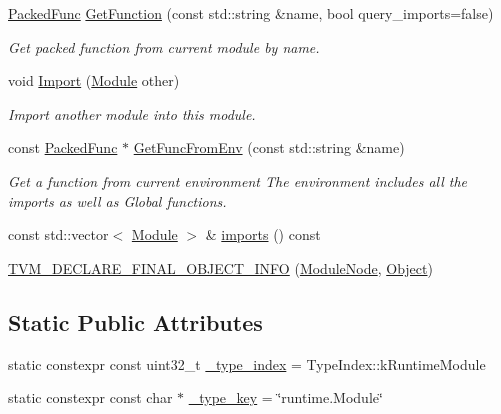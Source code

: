 \begin{DoxyCompactItemize}
\hyperlink{classtvm_1_1runtime_1_1PackedFunc}{Packed\+Func} \hyperlink{classtvm_1_1runtime_1_1ModuleNode_abd6d000714e0ed2b3b2f435ea5bd9a43}{Get\+Function} (const std\+::string \&name, bool query\+\_\+imports=false)
\begin{DoxyCompactList}\small\item\em Get packed function from current module by name. \end{DoxyCompactList}\item 
void \hyperlink{classtvm_1_1runtime_1_1ModuleNode_a79b98521b484d1c672b7ce2ae2aed2b5}{Import} (\hyperlink{classtvm_1_1runtime_1_1Module}{Module} other)
\begin{DoxyCompactList}\small\item\em Import another module into this module. \end{DoxyCompactList}\item 
const \hyperlink{classtvm_1_1runtime_1_1PackedFunc}{Packed\+Func} $\ast$ \hyperlink{classtvm_1_1runtime_1_1ModuleNode_aa2820340181ff4a9eaa149f89ac706ec}{Get\+Func\+From\+Env} (const std\+::string \&name)
\begin{DoxyCompactList}\small\item\em Get a function from current environment The environment includes all the imports as well as Global functions. \end{DoxyCompactList}\item 
const std\+::vector$<$ \hyperlink{classtvm_1_1runtime_1_1Module}{Module} $>$ \& \hyperlink{classtvm_1_1runtime_1_1ModuleNode_abb10abf603900cbd0bfd51eeb44eb949}{imports} () const 
\item 
\hyperlink{classtvm_1_1runtime_1_1ModuleNode_ac44750d06e11a275b10072b982ef4b13}{T\+V\+M\+\_\+\+D\+E\+C\+L\+A\+R\+E\+\_\+\+F\+I\+N\+A\+L\+\_\+\+O\+B\+J\+E\+C\+T\+\_\+\+I\+N\+FO} (\hyperlink{classtvm_1_1runtime_1_1ModuleNode}{Module\+Node}, \hyperlink{classtvm_1_1runtime_1_1Object}{Object})
\end{DoxyCompactItemize}
\subsection*{Static Public Attributes}
\begin{DoxyCompactItemize}
\item 
static constexpr const uint32\+\_\+t \hyperlink{classtvm_1_1runtime_1_1ModuleNode_a56e23ef9427bd055c4868135cc1f38bd}{\+\_\+type\+\_\+index} = Type\+Index\+::k\+Runtime\+Module
\item 
static constexpr const char $\ast$ \hyperlink{classtvm_1_1runtime_1_1ModuleNode_a9346e3758203ca87d500e65de0445e01}{\+\_\+type\+\_\+key} = \char`\"{}runtime.\+Module\char`\"{}
\end{DoxyCompactItemize}
